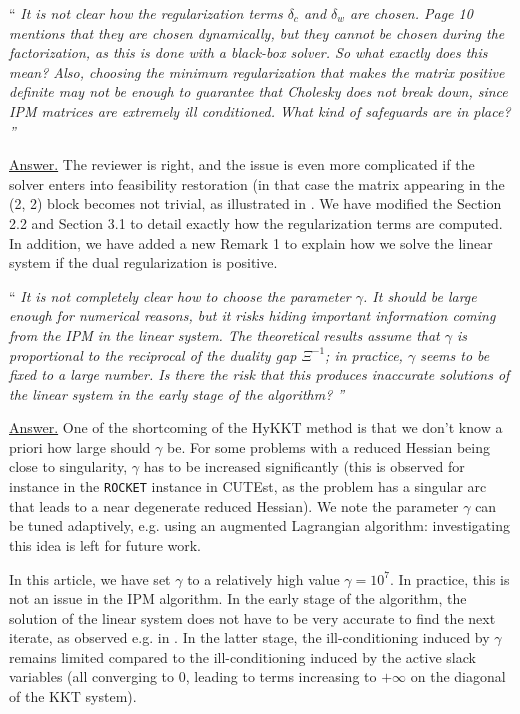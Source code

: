 \documentclass[10pt,a4paper]{article}
\newenvironment{quotereviewer}{\vspace{.5cm}{\underline\reviewername} ``\it\footnotesize}{''}
\newcommand{\answer}{\vspace{1mm}\underline{Answer.} }
\begin{document}
\begin{quotereviewer}
It is not clear how the regularization terms $\delta_c$ and $\delta_w$ are chosen. Page 10 mentions that they are chosen dynamically, but they cannot be chosen during the factorization, as this is done with a black-box solver. So what exactly does this mean? Also, choosing the minimum regularization that makes the matrix positive definite may not be enough to guarantee that Cholesky does not break down, since IPM matrices are extremely ill conditioned. What kind of safeguards are in place?
\end{quotereviewer}

\answer The reviewer is right, and the issue is even more complicated
if the solver enters into feasibility restoration (in that case the matrix appearing
in the (2, 2) block becomes not trivial, as illustrated in \cite[Eq (32)]{wachter2006implementation}.
We have modified the Section 2.2 and Section 3.1 to detail exactly how the regularization
terms are computed. In addition, we have added a new Remark 1 to explain how we solve
the linear system if the dual regularization is positive.


\begin{quotereviewer}
It is not completely clear how to choose the parameter $\gamma$. It should be large enough for numerical reasons, but it risks hiding important information coming from the IPM in the linear system. The theoretical results assume that $\gamma$ is proportional to the reciprocal of the duality gap $\Xi^{-1}$; in practice, $\gamma$ seems to be fixed to a large number. Is there the risk that this produces inaccurate solutions of the linear system in the early stage of the algorithm?
\end{quotereviewer}

\answer
One of the shortcoming of the HyKKT method is that we don't know a priori how large should $\gamma$ be. For some problems with a
reduced Hessian being close to singularity, $\gamma$ has to be increased significantly (this is observed for instance in the {\tt ROCKET} instance in CUTEst, as the problem has
a singular arc that leads to a near degenerate reduced Hessian).
We note the parameter $\gamma$ can be tuned adaptively, e.g. using an augmented Lagrangian algorithm: investigating this idea is left for future work.

In this article, we have set $\gamma$ to a relatively high value $\gamma = 10^7$. In practice, this is not an issue in the IPM algorithm.
In the early stage of the algorithm, the solution of the linear system does not have to be very accurate to find the next iterate, as observed e.g. in \cite{zanetti2023new}.
In the latter stage, the ill-conditioning induced by $\gamma$ remains limited compared to the ill-conditioning induced by the active slack variables (all converging to $0$, leading
to terms increasing to $+\infty$ on the diagonal of the KKT system).
\end{document}
